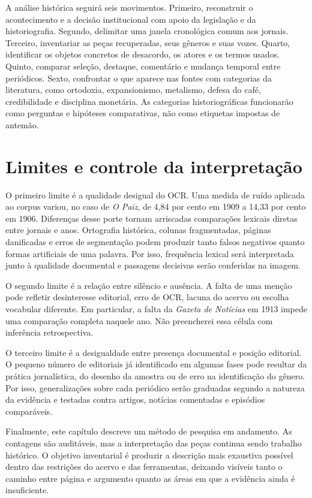 A análise histórica seguirá seis movimentos. Primeiro, reconstruir o acontecimento e a decisão institucional com apoio da legislação e da historiografia. Segundo, delimitar uma janela cronológica comum aos jornais. Terceiro, inventariar as peças recuperadas, seus gêneros e suas vozes. Quarto, identificar os objetos concretos de desacordo, os atores e os termos usados. Quinto, comparar seleção, destaque, comentário e mudança temporal entre periódicos. Sexto, confrontar o que aparece nas fontes com categorias da literatura, como ortodoxia, expansionismo, metalismo, defesa do café, credibilidade e disciplina monetária. As categorias historiográficas funcionarão como perguntas e hipóteses comparativas, não como etiquetas impostas de antemão.

\section{Limites e controle da interpretação}

O primeiro limite é a qualidade desigual do OCR. Uma medida de ruído aplicada ao corpus variou, no caso de \textit{O Paiz}, de 4,84 por cento em 1909 a 14,33 por cento em 1906. Diferenças desse porte tornam arriscadas comparações lexicais diretas entre jornais e anos. Ortografia histórica, colunas fragmentadas, páginas danificadas e erros de segmentação podem produzir tanto falsos negativos quanto formas artificiais de uma palavra. Por isso, frequência lexical será interpretada junto à qualidade documental e passagens decisivas serão conferidas na imagem.

O segundo limite é a relação entre silêncio e ausência. A falta de uma menção pode refletir desinteresse editorial, erro de OCR, lacuna do acervo ou escolha vocabular diferente. Em particular, a falta da \textit{Gazeta de Notícias} em 1913 impede uma comparação completa naquele ano. Não preencherei essa célula com inferência retrospectiva.

O terceiro limite é a desigualdade entre presença documental e posição editorial. O pequeno número de editoriais já identificado em algumas fases pode resultar da prática jornalística, do desenho da amostra ou de erro na identificação do gênero. Por isso, generalizações sobre cada periódico serão graduadas segundo a natureza da evidência e testadas contra artigos, notícias comentadas e episódios comparáveis.

Finalmente, este capítulo descreve um método de pesquisa em andamento. As contagens são auditáveis, mas a interpretação das peças continua sendo trabalho histórico. O objetivo inventarial é produzir a descrição mais exaustiva possível dentro das restrições do acervo e das ferramentas, deixando visíveis tanto o caminho entre página e argumento quanto as áreas em que a evidência ainda é insuficiente.

